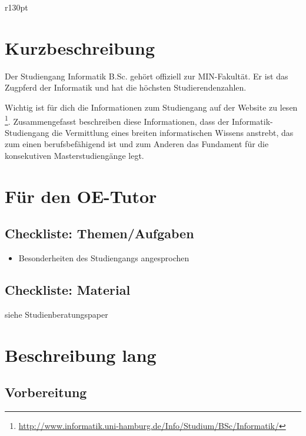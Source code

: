\documentclass[a4paper,11pt]{scrartcl} %
\newenvironment{myitemize}{\begin{itemize}\itemsep -2pt}{\end{itemize}} %
\begin{document}
\thispagestyle{firststyle}

\begin{wrapfigure}{r}{130pt}
\vspace{-78pt}
  \fbox{
  \begin{minipage}{140pt}
   \tableofcontents
  \end{minipage}
  }
\end{wrapfigure}

\section{Kurzbeschreibung}
    Der Studiengang Informatik B.Sc. gehört offiziell zur MIN-Fakultät. Er ist das Zugpferd der Informatik und hat die höchsten Studierendenzahlen. 

    Wichtig ist für dich die Informationen zum Studiengang auf der Website zu lesen \footnote{\url{http://www.informatik.uni-hamburg.de/Info/Studium/BSc/Informatik/}}.
    Zusammengefasst beschreiben diese Informationen, dass der Informatik-Studiengang die Vermittlung eines breiten informatischen Wissens anstrebt, das zum einen berufsbefähigend ist und zum Anderen das Fundament für die konsekutiven Masterstudiengänge legt.
    
\section{Für den OE-Tutor}
  \subsection{Checkliste: Themen/Aufgaben}
      \begin{myitemize}
          \item[\Square] Besonderheiten des Studiengangs angesprochen
      \end{myitemize}
    
   \subsection{Checkliste: Material}
    siehe Studienberatungspaper
\section{Beschreibung lang}

    \subsection{Vorbereitung}
\end{document}
